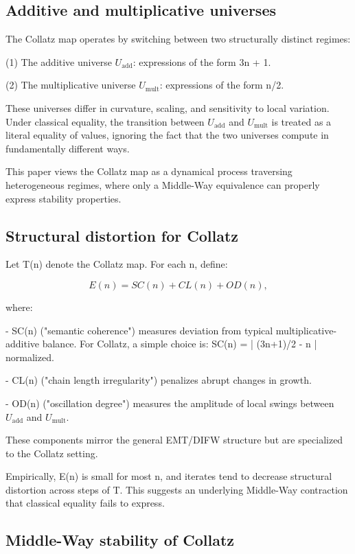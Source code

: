 \documentclass[11pt]{article}
\theoremstyle{definition}
\theoremstyle{remark}
\begin{document}
\subsection{Additive and multiplicative universes}

The Collatz map operates by switching between two structurally distinct
regimes:

(1) The additive universe $U_{\mathrm{add}}$:
    expressions of the form 3n + 1.

(2) The multiplicative universe $U_{\mathrm{mult}}$:
    expressions of the form n/2.

These universes differ in curvature, scaling, and sensitivity to local
variation. Under classical equality, the transition between $U_{\mathrm{add}}$ and
$U_{\mathrm{mult}}$ is treated as a literal equality of values, ignoring the fact that
the two universes compute in fundamentally different ways.

This paper views the Collatz map as a dynamical process traversing
heterogeneous regimes, where only a Middle-Way equivalence can properly
express stability properties.

\subsection{Structural distortion for Collatz}

Let T(n) denote the Collatz map. For each n, define:

\[
  E(n) = SC(n) + CL(n) + OD(n),
\]

where:

- SC(n) ("semantic coherence") measures deviation from typical
  multiplicative-additive balance. For Collatz, a simple choice is:
  SC(n) = | (3n+1)/2 - n | normalized.

- CL(n) ("chain length irregularity") penalizes abrupt changes in growth.

- OD(n) ("oscillation degree") measures the amplitude of local swings
  between $U_{\mathrm{add}}$ and $U_{\mathrm{mult}}$.

These components mirror the general EMT/DIFW structure but are
specialized to the Collatz setting.

Empirically, E(n) is small for most n, and iterates tend to decrease
structural distortion across steps of T. This suggests an underlying
Middle-Way contraction that classical equality fails to express.

\subsection{Middle-Way stability of Collatz}
\end{document}
